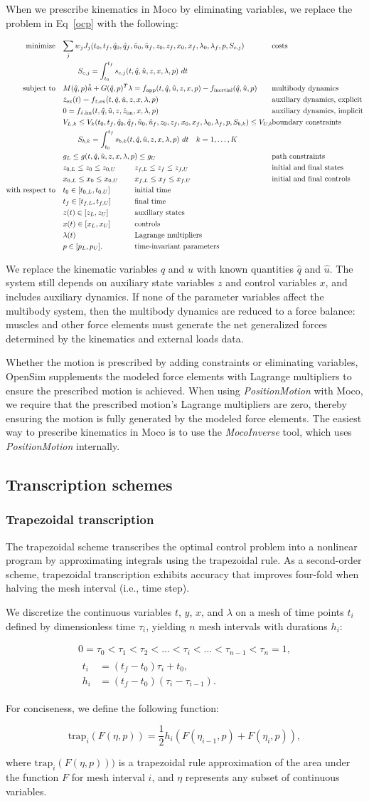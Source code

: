 \documentclass[10pt,letterpaper]{article}
\newcommand{\prescribed}{
\begin{adjustwidth}{-1.125in}{-1.125in} %
\begin{align}
    \begin{aligned}
        \mbox{minimize} \quad & \mathrlap{\sum_j w_j J_{j}(t_0, t_f, \hat{q}_0, \hat{q}_f, \hat{u}_0, \hat{u}_f, z_0, z_f, x_{0}, x_{f}, \lambda_0, \lambda_f, p, S_{c,j})} &&&\hspace{6em}& \textrm{costs} \\
        & \quad\quad \mathrlap{S_{c,j} = \int_{t_0}^{t_f} s_{c,j}(t, \hat{q}, \hat{u}, z, x, \lambda, p)~dt} \\
        \mbox{subject to} \quad &
         M(\hat{q}, p)\hat{\dot{u}} + \mathrlap{G(\hat{q}, p)^T \lambda = f_{\textrm{app}}(t, \hat{q}, \hat{u}, z, x, p) - f_{\textrm{inertial}}(\hat{q}, \hat{u}, p)} &&&& \textrm{multibody dynamics} \\
        & \mathrlap{\dot{z}_{\textrm{ex}}(t) = f_{\dot{z},\textrm{ex}}(t, \hat{q}, \hat{u}, z, x, \lambda, p)} &&&& \textrm{auxiliary dynamics, explicit} \\
        & \mathrlap{0 = f_{\dot{z},\textrm{im}}(t, \hat{q}, \hat{u}, z, \dot{z}_\textrm{im}, x, \lambda, p)} &&&& \textrm{auxiliary dynamics, implicit}\\
        & V_{L,k} \leq V_k(t_0, t_f, \hat{q}_0, \mathrlap{\hat{q}_f, \hat{u}_0, \hat{u}_f, z_0, z_f, x_{0}, x_{f}, \lambda_0, \lambda_f, p, S_{b,k}) \leq V_{U,k}}  &&&& \textrm{boundary constraints} \\
        & \quad\quad \mathrlap{S_{b,k} = \int_{t_0}^{t_f} s_{b,k}(t, \hat{q}, \hat{u}, z, x, \lambda, p)~dt \quad k = 1, \ldots, K} \\
        & \mathrlap{g_{L} \leq g(t, \hat{q}, \hat{u}, z, x, \lambda, p) \leq g_{U}} &&&& \textrm{path constraints} \\
        & z_{0,L} \leq z_0 \leq z_{0,U} && z_{f,L} \leq z_f \leq z_{f,U} && \textrm{initial and final states} \\
        & x_{0,L} \leq x_0 \leq x_{0,U} && x_{f,L} \leq x_f \leq x_{f,U} && \textrm{initial and final controls} \\
        \mbox{with respect to} \quad
        & t_0 \in [t_{0,L}, t_{0,U}] && \textrm{initial time} \\
        & t_f \in [t_{f,L}, t_{f,U}] && \textrm{final time} \\
        & z(t) \in [z_{L}, z_{U}] && \textrm{auxiliary states} \\
        & x(t) \in [x_{L}, x_{U}] && \textrm{controls} \\
        & \lambda(t) && \textrm{Lagrange multipliers} \\
        & p \in [p_{L}, p_{U}]. && \textrm{time-invariant parameters}
    \end{aligned}
\end{align}
\end{adjustwidth}
}
\newcommand{\traptau}{
\begin{equation}
    \begin{gathered}
        0 = \tau_0 < \tau_1 < \tau_2 < \ldots < \tau_i < \ldots < \tau_{n - 1} < \tau_n = 1, \\
        \begin{aligned}
        t_i &= (t_f - t_0) \tau_i + t_0, \\
        h_i &= (t_f - t_0)(\tau_i - \tau_{i-1}).
        \end{aligned}
    \end{gathered}
\end{equation}
}
\newcommand{\trapfunc}{
\begin{equation}
    \textrm{trap}_i(F(\eta, p)) = \frac{1}{2} h_i (F(\eta_{i-1}, p) + F(\eta_i, p)),
\end{equation}
}
\begin{document}
When we prescribe kinematics in Moco by eliminating variables, we replace the problem in Eq~\ref{ocp} with the following:
\prescribed
We replace the kinematic variables $q$ and $u$ with known quantities $\hat{q}$ and $\hat{u}$. The system still depends on auxiliary state variables $z$ and control variables $x$, and includes auxiliary dynamics. If none of the parameter variables affect the multibody system, then the multibody dynamics are reduced to a force balance: muscles and other force elements must generate the net generalized forces determined by the kinematics and external loads data.

Whether the motion is prescribed by adding constraints or eliminating variables, OpenSim supplements the modeled force elements with Lagrange multipliers to ensure the prescribed motion is achieved. When using \textit{PositionMotion} with Moco, we require that the prescribed motion's Lagrange multipliers are zero, thereby ensuring the motion is fully generated by the modeled force elements. The easiest way to prescribe kinematics in Moco is to use the \textit{MocoInverse} tool, which uses \textit{PositionMotion} internally.

\subsection*{Transcription schemes}

\subsubsection*{Trapezoidal transcription}

The trapezoidal scheme transcribes the optimal control problem into a nonlinear program by approximating integrals using the trapezoidal rule. As a second-order scheme, trapezoidal transcription exhibits accuracy that improves four-fold when halving the mesh interval (i.e., time step).

We discretize the continuous variables $t$, $y$, $x$, and $\lambda$ on a mesh of time points $t_i$ defined by dimensionless time $\tau_i$, yielding $n$ mesh intervals with durations $h_i$:
\traptau

For conciseness, we define the following function:
\trapfunc
where $\mathrm{trap}_i(F(\eta, p)))$ is a trapezoidal rule approximation of the area under the function $F$ for mesh interval $i$, and $\eta$ represents any subset of continuous variables.
\end{document}
